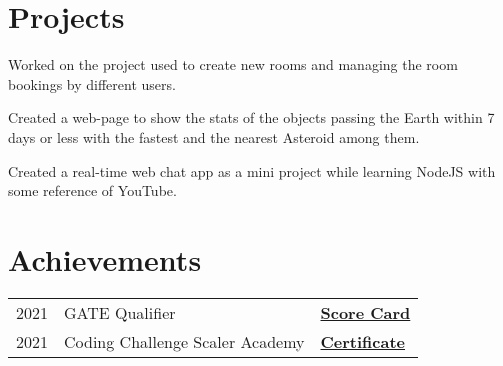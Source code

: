 \documentclass[]{deedy-resume-openfont}
\begin{document}
\begin{minipage}[t]{0.66\textwidth}
\section{Projects}
{\href{https://github.com/Niharika100/Niharika100-bookRoom_backend}{\bf{}}}
Worked on the project used to create new rooms and managing the room bookings by different users.  
\sectionsep

{\href{https://niharika100.github.io/nearEarthObjectStats/}{\bf{}}}
Created a web-page to show the stats of the objects passing the Earth within 7 days or less with the fastest and the nearest Asteroid among them. 
\sectionsep

{\href{https://github.com/Niharika100/WebChatApp}{\bf{}}}
Created a real-time web chat app as a mini project while learning NodeJS with some reference of YouTube.
\sectionsep


\section{Achievements} 
\begin{tabular}{rll}
2021	     & GATE Qualifier  & \bf{\href{https://drive.google.com/file/d/15GE8USUrYsOLWMyxbJCKXGUEODwfVKVF/view?usp=sharing}{Score Card}}\\
2021     & Coding Challenge Scaler Academy &  \bf{\href{https://drive.google.com/file/d/1FvnQb3Byb9vj0uEbBudwzwYHRNe2MFp1/view}{Certificate}} \\
\end{tabular}
\sectionsep

\end{minipage} 
\end{document}
